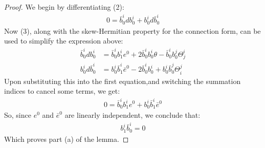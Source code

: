 \documentclass[11pt]{amsart}
\theoremstyle{definition}
\begin{document}
\begin{proof} We begin by differentiating (2):
%
\begin{align*}
0 = \bar{b}^i_0 d b^i_0 + b^i_0 d \bar{b}^i_0
\end{align*}
%
Now (3), along with the skew-Hermitian property for the connection form, can be used to simplify the expression above:
%
\begin{align*}
\bar{b}^i_0 d b^i_0 &= \bar{b}^i_0 b^i_1 e^0 + 2 \bar{b}^i_0 b^i_0 \theta - \bar{b}^i_0 b^j_0 \Theta^i_j \\
b^i_0 d \bar{b}^i_0 &= b^i_0 \bar{b}^i_1 \bar{e}^0 - 2 \bar{b}^i_0 b^i_0 + b^i_0 \bar{b}^j_0 \Theta^j_i
\end{align*}
%
Upon substituting this into the first equation,and switching the summation indices to cancel some terms, we get:
%
\begin{align*}
0 = \bar{b}^i_0 b^i_1 e^0 + b^i_0 \bar{b}^i_1 \bar{e}^0
\end{align*}
%
So, since $e^0$ and $\bar{e}^0$ are linearly independent, we conclude that:
%
\begin{align}
b^i_1 \bar{b}^i_0 = 0
\end{align}
%
Which proves part (a) of the lemma.


\end{proof}
\end{document}
